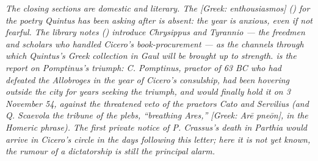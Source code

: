 \textit{The closing sections are domestic and literary. The
\textit{[Greek: enthousiasmos]} () for the
poetry Quintus has been asking after is absent: the year is
anxious, even if not fearful. The library notes
() introduce Chrysippus and Tyrannio --- the
freedmen and scholars who handled Cicero's book-procurement
--- as the channels through which Quintus's Greek collection
in Gaul will be brought up to strength.  is
the report on Pomptinus's triumph: C. Pomptinus, praetor of
63 BC who had defeated the Allobroges in the year of Cicero's
consulship, had been hovering outside the city for years
seeking the triumph, and would finally hold it on 3 November
54, against the threatened veto of the praetors Cato and
Servilius (and Q. Scaevola the tribune of the plebs, ``breathing
Ares,'' \textit{[Greek: Ar\=e pne\=on]}, in the Homeric
phrase). The first private notice of P. Crassus's death in
Parthia would arrive in Cicero's circle in the days following
this letter; here it is not yet known, the rumour of a
dictatorship is still the principal alarm.}
